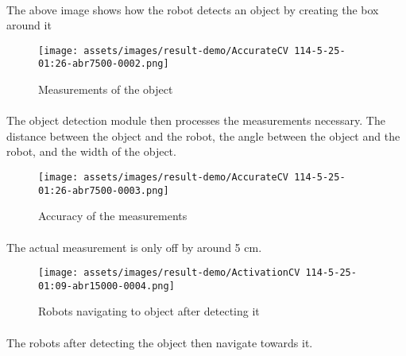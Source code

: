 \paragraph*{}
The above image shows how the robot detects an object by creating the box around it

\begin{figure}[H]
    \centering
    \texttt{[image: assets/images/result-demo/AccurateCV 114-5-25-01:26-abr7500-0002.png]}
    \caption{Measurements of the object}
    \label{fig:detail-result}
\end{figure}

\paragraph*{}
The object detection module then processes the measurements necessary. The distance between the object and the robot, the angle between the object and the robot, and the width of the object.

\begin{figure}[H]
    \centering
    \texttt{[image: assets/images/result-demo/AccurateCV 114-5-25-01:26-abr7500-0003.png]}
    \caption{Accuracy of the measurements}
    \label{fig:detail-result}
\end{figure}

\paragraph*{}
The actual measurement is only off by around 5 cm. 

\begin{figure}[H]
    \centering
    \texttt{[image: assets/images/result-demo/ActivationCV 114-5-25-01:09-abr15000-0004.png]}
    \caption{Robots navigating to object after detecting it}
    \label{fig:detail-result}
\end{figure}

\paragraph*{}
The robots after detecting the object then navigate towards it.